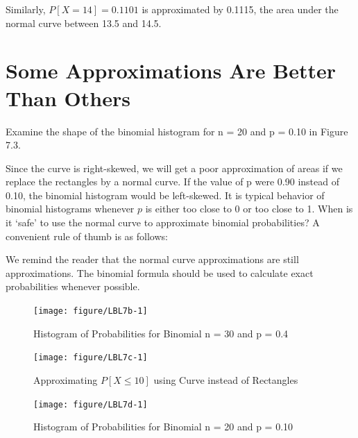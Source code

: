 \documentclass[11pt, chapterprefix=true]{scrbook}\usepackage[]{graphicx}\usepackage[]{color}
\begin{document}
Similarly, $P[X = 14] = 0.1101$ is approximated by 0.1115, the area under the normal curve between 13.5 and 14.5.

\section{Some Approximations Are Better Than Others}

Examine the shape of the binomial histogram for n = 20 and p = 0.10 in Figure 7.3.

Since the curve is right-skewed, we will get a poor approximation of areas if we replace the rectangles by a normal curve.  If the value of p were 0.90 instead of 0.10, the binomial histogram would be left-skewed.  It is typical behavior of binomial histograms whenever $p$ is either too close to 0 or too close to 1.  When is it `safe' to use the normal curve to approximate binomial probabilities?  A convenient rule of thumb is as follows:


We remind the reader that the normal curve approximations are still approximations.  The binomial formula should be used to calculate exact probabilities whenever possible.

\newpage

\begin{figure}[ht]

\caption{Histogram of Probabilities for Binomial n = 30 and p = 0.4}



{\centering \texttt{[image: figure/LBL7b-1]} 

}




 \end{figure}
 

\begin{figure}[ht]

\caption{Approximating $P[X \le 10]$ using Curve instead of Rectangles}



{\centering \texttt{[image: figure/LBL7c-1]} 

}




\end{figure}


 \begin{figure}[ht]

\caption{Histogram of Probabilities for Binomial n = 20 and p = 0.10}



{\centering \texttt{[image: figure/LBL7d-1]} 

}




\end{figure}
\end{document}
